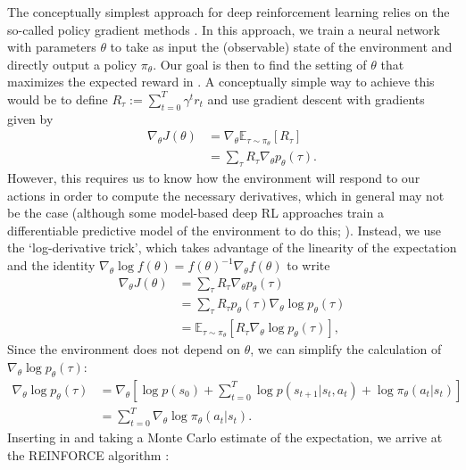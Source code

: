The conceptually simplest approach for deep reinforcement learning relies on the so-called policy gradient methods \citep{sutton2018reinforcement}.
In this approach, we train a neural network with parameters $\theta$ to take as input the (observable) state of the environment and directly output a policy $\pi_\theta$.
Our goal is then to find the setting of $\theta$ that maximizes the expected reward in .
A conceptually simple way to achieve this would be to define $R_\tau := \sum_{t=0}^T \gamma^t r_t$ and use gradient descent with gradients given by
\begin{align}
    \nabla_\theta J(\theta) &= \nabla_\theta \mathbb{E}_{\tau \sim \pi_\theta} \left [ R_\tau \right ]\\
    &= \sum_{\tau} R_\tau \nabla_\theta p_\theta(\tau).
\end{align}
However, this requires us to know how the environment will respond to our actions in order to compute the necessary derivatives, which in general may not be the case (although some model-based deep RL approaches train a differentiable predictive model of the environment to do this; \citealp{clavera2020model}).
Instead, we use the `log-derivative trick', which takes advantage of the linearity of the expectation and the identity $\nabla_\theta \log f(\theta) = f(\theta)^{-1} \nabla_\theta f(\theta)$ to write
\begin{align}
    \label{eq:deriv_J}
    \nabla_\theta J(\theta) & = \sum_\tau R_\tau \nabla_\theta p_\theta(\tau) \\
                            & = \sum_\tau R_\tau p_\theta(\tau) \nabla_\theta \log p_\theta(\tau) \\
                            & = \mathbb{E}_{\tau \sim \pi_\theta} \left [ R_\tau \nabla_\theta \log p_\theta(\tau) \right ],
\end{align}
Since the environment does not depend on $\theta$, we can simplify the calculation of $\nabla_\theta \log p_\theta (\tau)$:
\begin{align}
    \label{eq:deriv_log_ptau}
    \nabla_\theta \log p_\theta(\tau) & = \nabla_\theta \left [ \log p(s_0) + \sum_{t=0}^T \log p(s_{t+1} | s_t, a_t) + \log \pi_\theta (a_t|s_t) \right ] \\
                                      & = \sum_{t=0}^T \nabla_\theta \log \pi_\theta (a_t|s_t).
\end{align}
Inserting  in  and taking a Monte Carlo estimate of the expectation, we arrive at the REINFORCE algorithm \citep{williams1992simple}:

